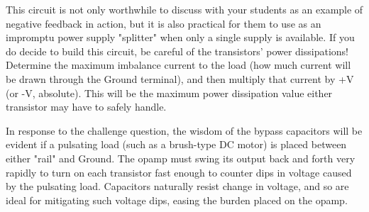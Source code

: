 
This circuit is not only worthwhile to discuss with your students as an example of negative feedback in action, but it is also practical for them to use as an impromptu power supply "splitter" when only a single supply is available.  If you do decide to build this circuit, be careful of the transistors' power dissipations!  Determine the maximum imbalance current to the load (how much current will be drawn through the Ground terminal), and then multiply that current by +V (or -V, absolute).  This will be the maximum power dissipation value either transistor may have to safely handle.

In response to the challenge question, the wisdom of the bypass capacitors will be evident if a pulsating load (such as a brush-type DC motor) is placed between either "rail" and Ground.  The opamp must swing its output back and forth very rapidly to turn on each transistor fast enough to counter dips in voltage caused by the pulsating load.  Capacitors naturally resist change in voltage, and so are ideal for mitigating such voltage dips, easing the burden placed on the opamp.




